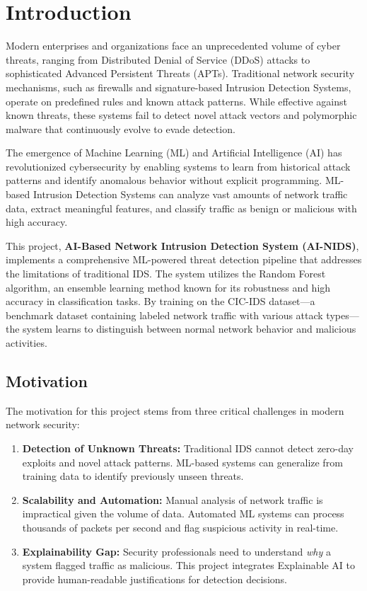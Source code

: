 \documentclass[12pt,a4paper]{article}
\begin{document}
\newpage

\section{Introduction}

Modern enterprises and organizations face an unprecedented volume of cyber threats, ranging from Distributed Denial of Service (DDoS) attacks to sophisticated Advanced Persistent Threats (APTs). Traditional network security mechanisms, such as firewalls and signature-based Intrusion Detection Systems, operate on predefined rules and known attack patterns. While effective against known threats, these systems fail to detect novel attack vectors and polymorphic malware that continuously evolve to evade detection.

The emergence of Machine Learning (ML) and Artificial Intelligence (AI) has revolutionized cybersecurity by enabling systems to learn from historical attack patterns and identify anomalous behavior without explicit programming. ML-based Intrusion Detection Systems can analyze vast amounts of network traffic data, extract meaningful features, and classify traffic as benign or malicious with high accuracy.

This project, \textbf{AI-Based Network Intrusion Detection System (AI-NIDS)}, implements a comprehensive ML-powered threat detection pipeline that addresses the limitations of traditional IDS. The system utilizes the Random Forest algorithm, an ensemble learning method known for its robustness and high accuracy in classification tasks. By training on the CIC-IDS dataset—a benchmark dataset containing labeled network traffic with various attack types—the system learns to distinguish between normal network behavior and malicious activities.

\subsection{Motivation}

The motivation for this project stems from three critical challenges in modern network security:

\begin{enumerate}
    \item \textbf{Detection of Unknown Threats:} Traditional IDS cannot detect zero-day exploits and novel attack patterns. ML-based systems can generalize from training data to identify previously unseen threats.
    
    \item \textbf{Scalability and Automation:} Manual analysis of network traffic is impractical given the volume of data. Automated ML systems can process thousands of packets per second and flag suspicious activity in real-time.
    
    \item \textbf{Explainability Gap:} Security professionals need to understand \textit{why} a system flagged traffic as malicious. This project integrates Explainable AI to provide human-readable justifications for detection decisions.
\end{enumerate}
\end{document}
